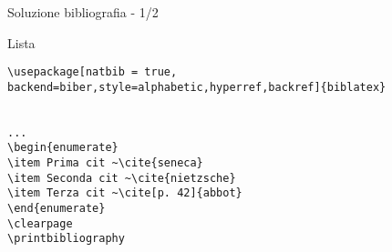 \begin{frame}[fragile]{Soluzione bibliografia - 1/2}

\begin{block}{Lista}
    
\begin{lstlisting}
\usepackage[natbib = true, backend=biber,style=alphabetic,hyperref,backref]{biblatex}


...
\begin{enumerate}
\item Prima cit ~\cite{seneca}
\item Seconda cit ~\cite{nietzsche}
\item Terza cit ~\cite[p. 42]{abbot}
\end{enumerate}
\clearpage
\printbibliography
\end{lstlisting}

\end{block}

\end{frame}
